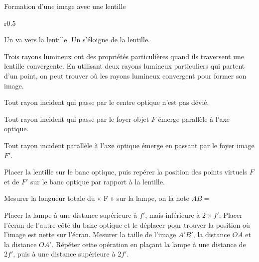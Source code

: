 \begin{doc}{Formation d'une image avec une lentille}
  \begin{wrapfigure}[6]{r}{0.5\linewidth}
    \vspace{-20pt}
    \begin{boite}
      \vspace{-8pt}
      \begin{importants}
        Un  va vers la lentille.
        Un  s'éloigne de la lentille.
      \end{importants}
    \end{boite}
  \end{wrapfigure}
  
  Trois rayons lumineux ont des propriétés particulières quand ils traversent une lentille convergente. 
  En utilisant deux rayons lumineux particuliers qui partent d'un point, on peut trouver où les rayons lumineux convergent pour former son image.

  \begin{listePoints}
    \item Tout rayon incident qui passe par le centre optique n'est pas dévié.
    \item Tout rayon incident qui passe par le foyer objet $F$ émerge parallèle à l'axe optique.
    \item Tout rayon incident parallèle à l'axe optique émerge en passant par le foyer image $F'$.
  \end{listePoints}

  \begin{center}
  \end{center}
\end{doc}

\mesure
Placer la lentille sur le banc optique, puis repérer la position des points virtuels $F$ et de $F'$ sur le banc optique par rapport à la lentille.

\mesure
Mesurer la longueur totale du « F » sur la lampe, on la note $AB =$

\mesure 
Placer la lampe à une distance supérieure à $f'$, mais inférieure à $2\times f'$. 
Placer l'écran de l'autre côté du banc optique et le déplacer pour trouver la position où l'image est nette sur l'écran.
Mesurer la taille de l'image $A'B'$, la distance $OA$ et la distance $OA'$.
Répéter cette opération en plaçant la lampe à une distance de $2f'$, puis à une distance supérieure à $2f'$.


